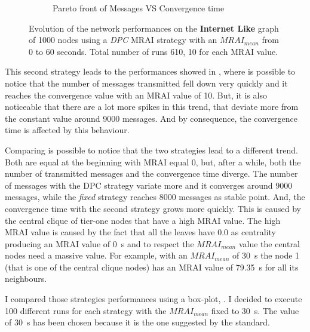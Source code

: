 \begin{figure}[h]
\begin{subfigure}[b]{0.477\textwidth}
		 \caption{Pareto front of Messages VS Convergence time}
         \label{fig:internt_like_1000_DPC_evolution_paretoFront}
     \end{subfigure}
		\caption{Evolution of the network performances on the \textbf{Internet Like} graph
			of \num{1000} nodes using a \textit{DPC} \ac{MRAI} strategy
			with an $MRAI_{mean}$ from \num{0} to \num{60} seconds. Total number
			of runs \num{610}, \num{10} for each \ac{MRAI} value.}
        \label{fig:internet_like_1000_dpc_evolution}
\end{figure}

This second strategy leads to the performances showed in ,
where is possible to notice that the number of messages transmitted fell down
very quickly and it reaches the convergence value with an \ac{MRAI} value of
\num{10}.
But, it is also noticeable that there are a lot more spikes in this trend, that
deviate more from the constant value around \num{9000} messages.
And by consequence, the convergence time is affected by this behaviour.

Comparing 
is possible to notice that the two strategies lead to a different trend.
Both are equal at the beginning with \ac{MRAI} equal \num{0}, but, after a while,
both the number of transmitted messages and the convergence time diverge.
The number of messages with the \ac{DPC} strategy variate more and it converges
around \num{9000} messages, while the \textit{fixed} strategy reaches \num{8000}
messages as stable point.
And, the convergence time with the second strategy grows more quickly.
This is caused by the central clique of tier-one nodes that have a high \ac{MRAI}
value.
The high \ac{MRAI} value is caused by the fact that all the leaves have \num{0.0}
as centrality producing an \ac{MRAI} value of \SI{0}{\second} and to respect
the $MRAI_{mean}$ value the central nodes need a massive value.
For example, with an $MRAI_{mean}$ of \SI{30}{\second} the node \num{1} (that is
one of the central clique nodes) has an \ac{MRAI} value of \SI{79.35}{\second} for all its
neighbours.

I compared those strategies performances using a box-plot, .
I decided to execute \num{100} different runs for each strategy with the $MRAI_{mean}$
fixed to \SI{30}{\second}.
The value of \SI{30}{\second} has been chosen because it is the one suggested by the standard.

